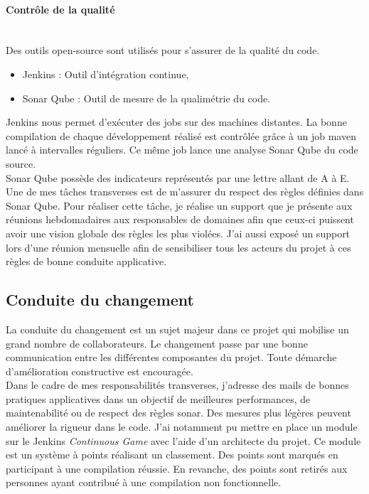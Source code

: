 \documentclass[12pt,a4paper]{article}
\begin{document}
\paragraph{Contrôle de la qualité}
~~\\
Des outils open-source sont utilisés pour s'assurer de la qualité du code. 
\begin{itemize}
\item Jenkins : Outil d'intégration continue,
\item Sonar Qube : Outil de mesure de la qualimétrie du code.
\end{itemize}
Jenkins nous permet d'exécuter des jobs sur des machines distantes. La bonne compilation de chaque développement réalisé est contrôlée grâce à un job maven lancé à intervalles réguliers. Ce même job lance une analyse Sonar Qube du code source.\\
Sonar Qube possède des indicateurs représentés par une lettre allant de A à E. Une de mes tâches transverses est de m'assurer du respect des règles définies dans Sonar Qube. Pour réaliser cette tâche, je réalise un support que je présente aux réunions hebdomadaires aux responsables de domaines afin que ceux-ci puissent avoir une vision globale des règles les plus violées. J'ai aussi exposé un support lors d'une réunion mensuelle afin de sensibiliser tous les acteurs du projet à ces règles de bonne conduite applicative.
\subsection{Conduite du changement}
La conduite du changement est un sujet majeur dans ce projet qui mobilise un grand nombre de collaborateurs. Le changement passe par une bonne communication entre les différentes composantes du projet. Toute démarche d'amélioration constructive est encouragée.\\
Dans le cadre de mes responsabilités transverses, j'adresse des mails de bonnes pratiques applicatives dans un objectif de meilleures performances, de maintenabilité ou de respect des règles sonar.
Des mesures plus légères peuvent améliorer la rigueur dans le code. J'ai notamment pu mettre en place un module sur le Jenkins \emph{Continuous Game} avec l'aide d'un architecte du projet. Ce module est un système à points réalisant un classement. Des points sont marqués en participant à une compilation réussie. En revanche, des points sont retirés aux personnes ayant contribué à une compilation non fonctionnelle.
\clearpage
\newpage
\end{document}
